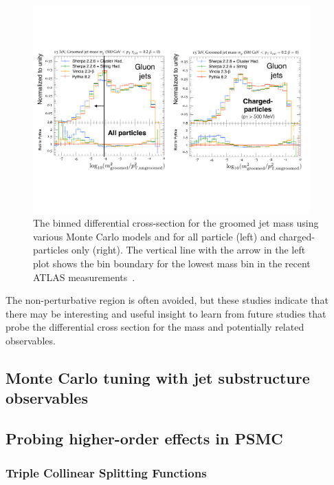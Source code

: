 \documentclass[11pt]{cernrep}
\begin{document}
\begin{figure}[h!]
\centering
\includegraphics[width=0.95\textwidth]{figs/NPbumptracks.pdf}
\caption{The binned differential cross-section for the groomed jet mass using various Monte Carlo models and for all particle (left) and charged-particles only (right).  The vertical line with the arrow in the left plot shows the bin boundary for the lowest mass bin in the recent ATLAS measurements~\cite{Aaboud:2017qwh,Aad:2019vyi}.}
\label{fig:jets:np:tracks}
\end{figure}

The non-perturbative region is often avoided, but these studies indicate that there may be interesting and useful insight to learn from future studies that probe the differential cross section for the mass and potentially related observables.

\clearpage

\subsection{Monte Carlo tuning with jet substructure observables}
\label{sec:jets:mc}




\subsection{Probing higher-order effects in PSMC}
\label{sec:jets:psmc}

\subsubsection{Triple Collinear Splitting Functions}
\end{document}

